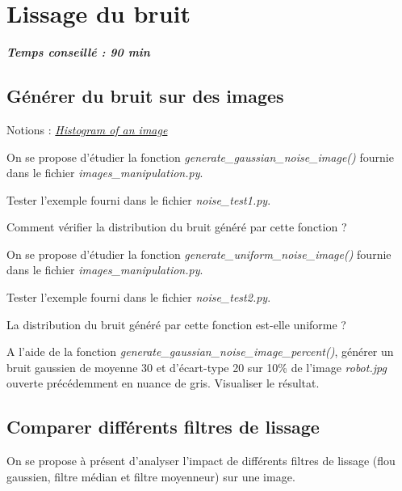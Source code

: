 \documentclass[a4paper,11pt,titlepage]{article} %
\begin{document}
\section{Lissage du bruit}

\begin{center} \textbf{\textit{Temps conseillé : 90 min}} \end{center}

\subsection{Générer du bruit sur des images}

\begin{mdframed}[style=sidebar,frametitle={}]
Notions : \href{https://iogs-lense-training.github.io/image-processing/contents/opencv.html#histogram-of-an-image}{\textit{Histogram of an image}} 
\end{mdframed}

On se propose d'étudier la fonction \textsl{generate\_gaussian\_noise\_image()} fournie dans le fichier \textsl{images\_manipulation.py}.

\Manip Tester l'exemple fourni dans le fichier \textsl{noise\_test1.py}.

\Quest Comment vérifier la distribution du bruit généré par cette fonction ?

\medskip

On se propose d'étudier la fonction \textsl{generate\_uniform\_noise\_image()} fournie dans le fichier \textsl{images\_manipulation.py}.

\Manip Tester l'exemple fourni dans le fichier \textsl{noise\_test2.py}.

\Quest La distribution du bruit généré par cette fonction est-elle uniforme ?

\Manip A l'aide de la fonction \textsl{generate\_gaussian\_noise\_image\_percent()}, générer un bruit gaussien de moyenne 30 et d'écart-type 20 sur 10\% de l'image \textsl{robot.jpg} ouverte précédemment en nuance de gris. Visualiser le résultat.



\newpage
\subsection{Comparer différents filtres de lissage}

On se propose à présent d'analyser l'impact de différents filtres de lissage  (flou gaussien, filtre médian et filtre moyenneur) sur une image.
\end{document}

